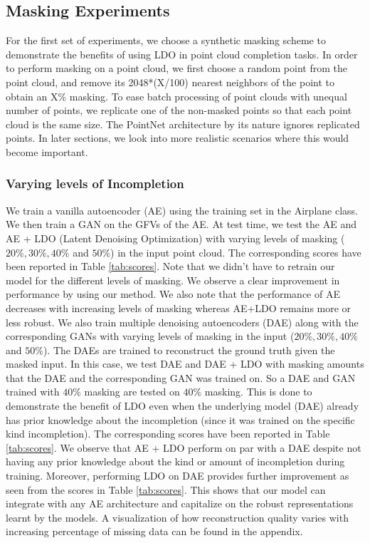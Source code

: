 \documentclass[10pt,twocolumn,letterpaper]{article}
\begin{document}
\subsection{Masking Experiments}
\label{sec:masking}
For the first set of experiments, we choose a synthetic masking scheme to demonstrate the benefits of using LDO in point cloud completion tasks. In order to perform masking on a point cloud, we first choose a random point from the point cloud, and remove its 2048*(X/100) nearest neighbors of the point to obtain an X\% masking. To ease batch processing of point clouds with unequal number of points, we replicate one of the non-masked points so that each point cloud is the same size. The PointNet architecture by its nature ignores replicated points. In later sections, we look into more realistic scenarios where this would become important. 
\subsubsection{Varying levels of Incompletion}
We train a vanilla autoencoder (AE) using the training set in the Airplane class. We then train a GAN on the GFVs of the AE. At test time, we test the AE and AE + LDO (Latent Denoising Optimization) with varying levels of masking ($20\%, 30\%, 40\%$ and $50\%$) in the input point cloud. The corresponding scores have been reported in Table \ref{tab:scores}. Note that we didn't have to retrain our model for the different levels of masking. We observe a clear improvement in performance by using our method. We also note that the performance of AE decreases with increasing levels of masking whereas AE+LDO remains more or less robust.
We also train multiple denoising autoencoders (DAE) along with the corresponding GANs with varying levels of masking in the input ($20\%, 30\%, 40\%$ and $50\%$). The DAEs are trained to reconstruct the ground truth given the masked input. In this case, we test DAE and DAE + LDO with masking amounts that the DAE and the corresponding GAN was trained on. So a DAE and GAN trained with $40\%$ masking are tested on $40\%$ masking. This is done to demonstrate the benefit of LDO even when the underlying model (DAE) already has prior knowledge about the incompletion (since it was trained on the specific kind incompletion). The corresponding scores have been reported in Table \ref{tab:scores}. We observe that AE + LDO perform on par with a DAE despite not having any prior knowledge about the kind or amount of incompletion during training. Moreover, performing LDO on DAE provides further improvement as seen from the scores in Table \ref{tab:scores}. This shows that our model can integrate with any AE architecture and capitalize on the robust representations learnt by the models. A visualization of how reconstruction quality varies with increasing percentage of missing data can be found in the appendix. 
\end{document}

